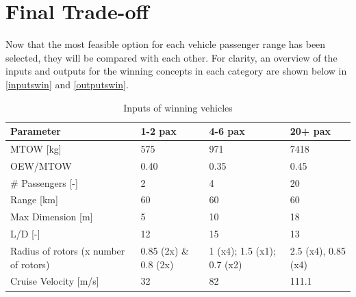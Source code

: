 \section{Final Trade-off}
\label{Sec:FinalTO}
Now that the most feasible option for each vehicle passenger range has been selected, they will be compared with each other. For clarity, an overview of the inputs and outputs for the winning concepts in each category are shown below in \autoref{inputswin} and \autoref{outputswin}. 

\begin{table}[H]
\captionsetup{justification=centering}
\caption{Inputs of winning vehicles}
\label{inputswin}
\begin{tabular}{llll}
\hline
\textbf{Parameter}                    & \textbf{1-2 pax}      & \textbf{4-6 pax} & \textbf{20+ pax}    \\ \hline
MTOW {[}kg{]}                         & 575                   &    971              & 7418                \\
OEW/MTOW        & 0.40                    &   0.35          & 0.45                  \\
\# Passengers {[}-{]}                 & 2                     &      4            & 20                  \\
Range {[}km{]}                        & 60                    &       60           & 60                  \\
Max Dimension {[}m{]}                 & 5                     &      10            & 18                  \\
L/D {[}-{]}                           & 12                    &       15           & 13                  \\
Radius of rotors (x number of rotors) & 0.85 (2x) \& 0.8 (2x) &    1 (x4); 1.5 (x1); 0.7 (x2)             & 2.5 (x4), 0.85 (x4) \\
Cruise Velocity {[}m/s{]}             & 32                    &        82          & 111.1               \\ \hline
\end{tabular}
\end{table}

